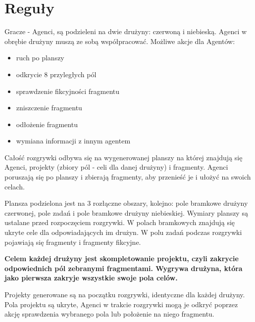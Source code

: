 \documentclass[Dokumentacja.tex]{subfiles}
\begin{document}
\section{Reguły}
Gracze - Agenci, są podzieleni na dwie drużyny: czerwoną i niebieską. Agenci w obrębie drużyny muszą ze sobą współpracować. Możliwe akcje dla Agentów:
\begin{itemize}
	\item ruch po planszy
	\item odkrycie 8 przyległych pól
	\item sprawdzenie fikcyjności fragmentu
	\item zniszczenie fragmentu
	\item odłożenie fragmentu
	\item wymiana informacji z innym agentem
\end{itemize}

Całość rozgrywki odbywa się na wygenerowanej planszy na której znajdują się Agenci, projekty (zbiory pól - celi dla danej drużyny) i fragmenty.  Agenci poruszają się po planszy i zbierają fragmenty, aby przenieść je i ułożyć na swoich celach.

Plansza podzielona jest na 3 rozłączne obszary, kolejno: pole bramkowe drużyny czerwonej, pole zadań i pole bramkowe drużyny niebieskiej. Wymiary planszy są ustalane przed rozpoczęciem rozgrywki. W polach bramkowych znajdują się ukryte cele dla odpowiadających im drużyn. W polu zadań podczas rozgrywki pojawiają się fragmenty i fragmenty fikcyjne.

\textbf{Celem każdej drużyny jest skompletowanie projektu, czyli zakrycie odpowiednich pól zebranymi fragmentami. Wygrywa drużyna, która jako pierwsza zakryje wszystkie swoje pola celów.}

Projekty generowane są na początku rozgrywki, identyczne dla każdej drużyny. Pola projektu są ukryte, Agenci w trakcie rozgrywki mogą je odkryć poprzez akcję sprawdzenia wybranego pola lub położenie na niego fragmentu.
\end{document}
